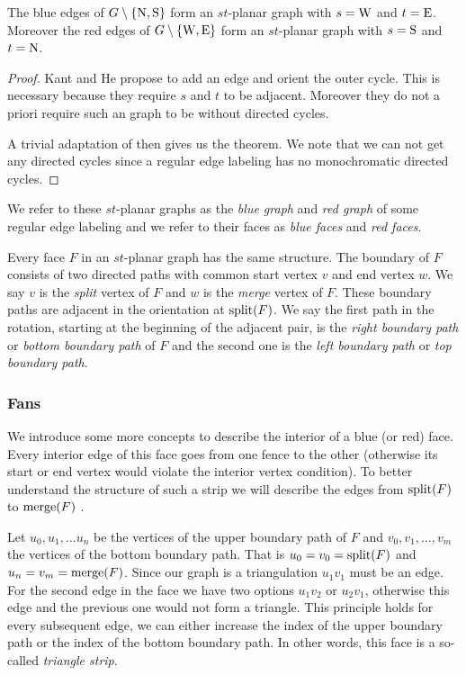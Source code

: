     \begin{thrm}
      \label{th:rel:stPlanarGraphs}
      The blue edges of $G\setminus \left\lbrace {\mathrm{N},\mathrm{S}} \right\rbrace$ form an $st$-planar graph with $s= \mathrm{W}$ and $t=\mathrm{E}$. Moreover the red edges of $G\setminus \left\lbrace {\mathrm{W},\mathrm{E}} \right\rbrace$ form an $st$-planar graph with $s= \mathrm{S}$ and $t= \mathrm{N}$.
    \end{thrm}
    \begin{proof}
      Kant and He propose to add an edge and orient the outer cycle. This is necessary because they require $s$ and $t$ to be adjacent. Moreover they do not a priori require such an graph to be without directed cycles.

      A trivial adaptation of \cite[pp.179]{Kant1997} then gives us the theorem. We note that we can not get any directed cycles since a regular edge labeling has no monochromatic directed cycles.
    \end{proof}


    We refer to these $st$-planar graphs as the \emph{blue graph} and \emph{red graph} of some regular edge labeling and we refer to their faces as \emph{blue faces} and \emph{red faces}.

    Every face $F$ in an $st$-planar graph has the same structure. The boundary of $F$ consists of two directed paths with common start vertex $v$ and end vertex $w$. We say $v$ is the \emph{split} vertex of $F$ and $w$ is the \emph{merge} vertex of $F$.
    These boundary paths are adjacent in the orientation at $\operatorname{split}(F)$. We say the first path in the rotation, starting at the beginning of the adjacent pair, is the \emph{right boundary path} or \emph{bottom boundary path} of $F$ and the second one is the \emph{left boundary path} or \emph{top boundary path}.

    \subsubsection{Fans}
    We introduce some more concepts to describe the interior of a blue (or red) face. Every interior edge of this face goes from one fence to the other (otherwise its start or end vertex would violate the interior vertex condition). To better understand the structure of such a strip we will describe the edges from $\operatorname{split}(F)$ to $\operatorname{merge}(F)$ .

    Let $u_0 , u_1, \ldots u_n$ be the vertices of the upper boundary path of $F$ and $v_0, v_1, \ldots, v_m$ the vertices of the bottom boundary path. That is $u_0=v_0 = \operatorname{split}(F)$ and $u_n = v_m = \operatorname{merge}(F)$. Since our graph is a triangulation $u_1v_1$ must be an edge. For the second edge in the face we have two options $u_1v_2$ or $u_2v_1$, otherwise this edge and the previous one would not form a triangle. This principle holds for every subsequent edge, we can either increase the index of the upper boundary path or the index of the bottom boundary path. In other words, this face is a so-called \emph{triangle strip}.

